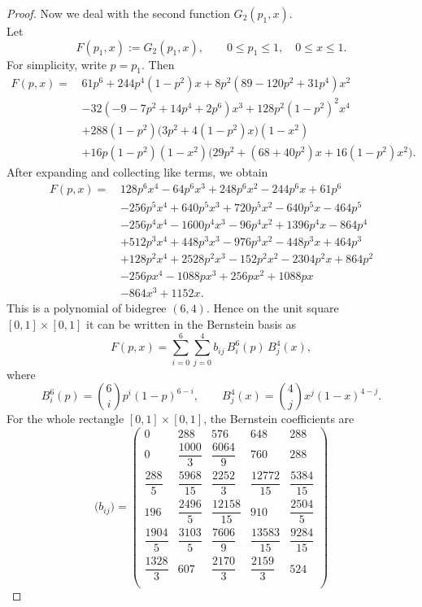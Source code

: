 \documentclass[a4paper,12pt,reqno]{amsart} %
\numberwithin{equation}{section}
\theoremstyle{definition}
\begin{document}
\begin{proof}
Now we deal with the second function $G_{2}(p_1, x)$.\\[2mm]
Let
\[
F(p_1,x):=G_2(p_1,x),
\qquad 0\le p_1\le 1,\quad 0\le x\le 1.
\]
For simplicity, write $p=p_{1}$. Then
\[
\begin{aligned}
	F(p,x)=\,&61 p^6 + 244 p^4 (1-p^2)x + 8p^2(89-120p^2+31p^4)x^2 \\
	&-32(-9-7p^2+14p^4+2p^6)x^3 + 128p^2(1-p^2)^2x^4 \\
	&+288(1-p^2)\bigl(3p^2+4(1-p^2)x\bigr)(1-x^2) \\
	&+16p(1-p^2)(1-x^2)\bigl(29p^2+(68+40p^2)x+16(1-p^2)x^2\bigr).
\end{aligned}
\]
After expanding and collecting like terms, we obtain
\[
\begin{aligned}
	F(p,x)=\,&128p^{6}x^{4}-64p^{6}x^{3}+248p^{6}x^{2}-244p^{6}x+61p^{6} \\
	&-256p^{5}x^{4}+640p^{5}x^{3}+720p^{5}x^{2}-640p^{5}x-464p^{5} \\
	&-256p^{4}x^{4}-1600p^{4}x^{3}-96p^{4}x^{2}+1396p^{4}x-864p^{4} \\
	&+512p^{3}x^{4}+448p^{3}x^{3}-976p^{3}x^{2}-448p^{3}x+464p^{3} \\
	&+128p^{2}x^{4}+2528p^{2}x^{3}-152p^{2}x^{2}-2304p^{2}x+864p^{2} \\
	&-256px^{4}-1088px^{3}+256px^{2}+1088px \\
	&-864x^{3}+1152x.
\end{aligned}
\]
This is a polynomial of bidegree $(6,4)$. Hence on the unit square $[0,1]\times[0, 1]$ it can be written in the Bernstein basis as
\[
F(p,x)=\sum_{i=0}^{6}\sum_{j=0}^{4} b_{ij}\,B_i^6(p)\,B_j^4(x),
\]
where
\[
B_i^6(p)=\binom{6}{i}p^i(1-p)^{6-i},
\qquad
B_j^4(x)=\binom{4}{j}x^j(1-x)^{4-j}.
\]
For the whole rectangle \([0,1]\times[0,1]\), the Bernstein coefficients are\\
\[
\bigl(b_{ij}\bigr)=
\begin{pmatrix}
	0 & 288 & 576 & 648 & 288\\[5mm]
	0 & \dfrac{1000}{3} & \dfrac{6064}{9} & 760 & 288\\[5mm]
	\dfrac{288}{5} & \dfrac{5968}{15} & \dfrac{2252}{3} & \dfrac{12772}{15} & \dfrac{5384}{15}\\[5mm]
	196 & \dfrac{2496}{5} & \dfrac{12158}{15} & 910 & \dfrac{2504}{5}\\[5mm]
	\dfrac{1904}{5} & \dfrac{3103}{5} & \dfrac{7606}{9} & \dfrac{13583}{15} & \dfrac{9284}{15}\\[5mm]
	\dfrac{1328}{3} & 607 & \dfrac{2170}{3} & \dfrac{2159}{3} & 524\\[5mm]

\end{pmatrix}\]
\end{proof}
\end{document}
